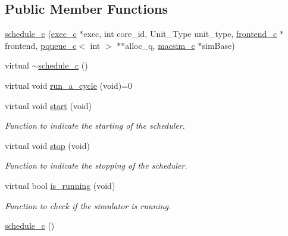 \subsection*{Public Member Functions}
\begin{DoxyCompactItemize}
\item 
\hyperlink{classschedule__c_aca30dd581b8b83035a0dc1ac13ae9f62}{schedule\_\-c} (\hyperlink{classexec__c}{exec\_\-c} $\ast$exec, int core\_\-id, Unit\_\-Type unit\_\-type, \hyperlink{classfrontend__c}{frontend\_\-c} $\ast$frontend, \hyperlink{classpqueue__c}{pqueue\_\-c}$<$ int $>$ $\ast$$\ast$alloc\_\-q, \hyperlink{classmacsim__c}{macsim\_\-c} $\ast$simBase)
\item 
virtual \hyperlink{classschedule__c_af8ea8faedf8812fb81810a208a3ad6cf}{$\sim$schedule\_\-c} ()
\item 
virtual void \hyperlink{classschedule__c_abaede0d6b5e70e5cfc6bf98801e387e1}{run\_\-a\_\-cycle} (void)=0
\item 
virtual void \hyperlink{classschedule__c_adbe783f74e34b8e1ae8f7ac707027509}{start} (void)
\begin{DoxyCompactList}\small\item\em Function to indicate the starting of the scheduler. \item\end{DoxyCompactList}\item 
virtual void \hyperlink{classschedule__c_a74262e51e68728870ac6de946c7d5e26}{stop} (void)
\begin{DoxyCompactList}\small\item\em Function to indicate the stopping of the scheduler. \item\end{DoxyCompactList}\item 
virtual bool \hyperlink{classschedule__c_a312b15c603395d8b36a1a1edb4838e70}{is\_\-running} (void)
\begin{DoxyCompactList}\small\item\em Function to check if the simulator is running. \item\end{DoxyCompactList}\item 
\hyperlink{classschedule__c_a2c5db70590e04fdb212b96aaa719a7ec}{schedule\_\-c} ()
\end{DoxyCompactItemize}
